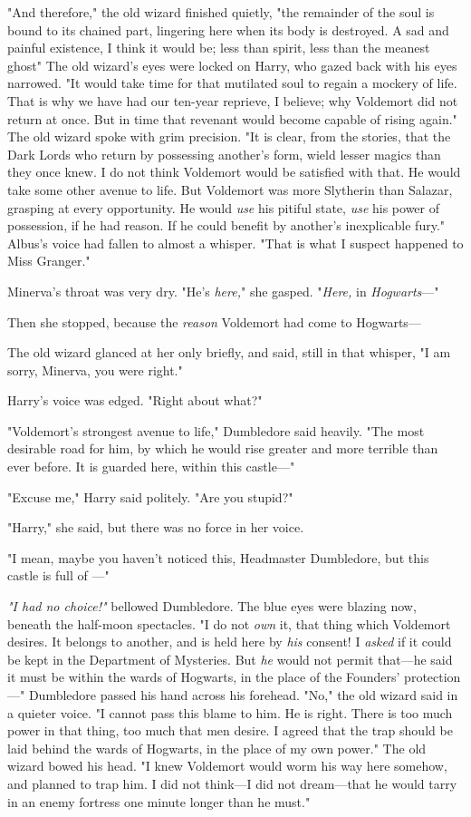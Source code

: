 "And therefore," the old wizard finished quietly, "the remainder of the soul is
bound to its chained part, lingering here when its body is destroyed. A sad and
painful existence, I think it would be; less than spirit, less than the meanest
ghost{\el}" The old wizard's eyes were locked on Harry, who gazed back with
his eyes narrowed. "It would take time for that mutilated soul to regain a
mockery of life. That is why we have had our ten-year reprieve, I believe; why
Voldemort did not return at once. But in time{\el} that revenant would
become capable of rising again." The old wizard spoke with grim precision. "It
is clear, from the stories, that the Dark Lords who return by possessing
another's form, wield lesser magics than they once knew. I do not think
Voldemort would be satisfied with that. He would take some other avenue to
life. But Voldemort was more Slytherin than Salazar, grasping at every
opportunity. He would \emph{use} his pitiful state, \emph{use} his power of
possession, if he had reason. If he could benefit by another's{\el}
inexplicable fury." Albus's voice had fallen to almost a whisper. "That is what
I suspect happened to Miss Granger."

Minerva's throat was very dry. "He's \emph{here,}" she gasped. "\emph{Here,} in
\emph{Hogwarts}\mbox{---}"

Then she stopped, because the \emph{reason} Voldemort had come to Hogwarts---

The old wizard glanced at her only briefly, and said, still in that whisper, "I
am sorry, Minerva, you were right."

Harry's voice was edged. "Right about what?"

"Voldemort's strongest avenue to life," Dumbledore said heavily. "The most
desirable road for him, by which he would rise greater and more terrible than
ever before. It is guarded here, within this castle\mbox{---}"

"Excuse me," Harry said politely. "Are you stupid?"

"Harry," she said, but there was no force in her voice.

"I mean, maybe you haven't noticed this, Headmaster Dumbledore, but this castle
is full of \emph{}\mbox{---}"

\emph{"I had no choice!"} bellowed Dumbledore. The blue eyes were blazing now,
beneath the half-moon spectacles. "I do not \emph{own} it, that thing which
Voldemort desires. It belongs to another, and is held here by \emph{his}
consent! I \emph{asked} if it could be kept in the Department of Mysteries. But
\emph{he} would not permit that---he said it must be within the wards of
Hogwarts, in the place of the Founders' protection\mbox{---}" Dumbledore passed his
hand across his forehead. "No," the old wizard said in a quieter voice. "I
cannot pass this blame to him. He is right. There is too much power in that
thing, too much that men desire. I agreed that the trap should be laid behind
the wards of Hogwarts, in the place of my own power." The old wizard bowed his
head. "I knew Voldemort would worm his way here somehow, and planned to trap
him. I did not think---I did not dream---that he would tarry in an enemy
fortress one minute longer than he must."

